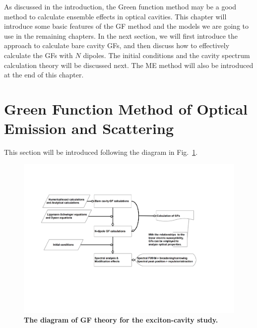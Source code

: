 As discussed in the introduction, the Green function method may be a good method to calculate ensemble effects in optical cavities. This chapter will introduce some basic features of the GF method and the models we are going to use in the remaining chapters. In the next section, we will first introduce the approach to calculate bare cavity GFs, and then discuss how to effectively calculate the GFs with $N$ dipoles. The initial conditions and the cavity spectrum calculation theory will be discussed next. The ME method will also be introduced at the end of this chapter.


\section{Green Function Method of Optical Emission and Scattering}
This section will be introduced following the diagram in Fig.~\ref{FromG2S}.

\begin{figure}[htp]%
\centering
\begin{center}
\includegraphics[width=16cm]{./Figs/FromG2S}%
\end{center}
\caption[The diagram of Green function theory for the exciton-cavity study.]{\textbf{The diagram of GF theory for the exciton-cavity study.} }
\label{FromG2S}
\end{figure}

